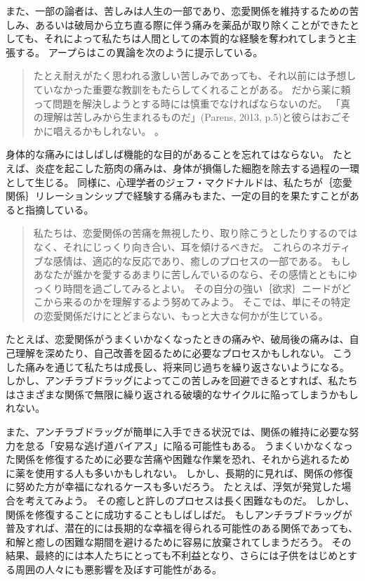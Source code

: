 \documentclass[paper=a4,book,openany]{jlreq}
\newcommand{\ig}[1]{}           %
\begin{document}
また、一部の論者は、苦しみは人生の一部であり、恋愛関係を維持するための苦しみ、あるいは破局から立ち直る際に伴う痛みを薬品が取り除くことができたとしても、それによって私たちは人間としての本質的な経験を奪われてしまうと主張する。
アープらはこの異論を次のように提示している。

\begin{quote}
たとえ耐えがたく思われる激しい苦しみであっても、それ以前には予想していなかった重要な教訓をもたらしてくれることがある。
だから薬に頼って問題を解決しようとする時には慎重でなければならないのだ。
「真の理解は苦しみから生まれるものだ」(Parens, 2013, p.5)\ig{Parens}と彼らはおごそかに唱えるかもしれない。
\citep[p.12]{earp13:_if_i_could_just_stop_lovin_you}\nocite{parens13:_good_bad_forms_medic}。
\end{quote}

身体的な痛みにはしばしば機能的な目的があることを忘れてはならない。
たとえば、炎症を起こした筋肉の痛みは、身体が損傷した細胞を除去する過程の一環として生じる。
同様に、心理学者のジェフ・マクドナルド\ig{(Geoff MacDonald)}は、私たちが｛恋愛関係｝{リレーションシップ}で経験する痛みもまた、一定の目的を果たすことがあると指摘している。

\begin{quote}
私たちは、恋愛関係の苦痛を無視したり、取り除こうとしたりするのではなく、それにじっくり向き合い、耳を傾けるべきだ。
これらのネガティブな感情は、適応的な反応であり、癒しのプロセスの一部である。
もしあなたが誰かを愛するあまりに苦しんでいるのなら、その感情とともにゆっくり時間を過ごしてみるとよい。
その自分の強い｛欲求｝{ニード}がどこから来るのかを理解するよう努めてみよう。
そこでは、単にその特定の恋愛関係だけにとどまらない、もっと大きな何かが生じている。
\citep{lawson17:_why_does_love_hurt_so_much}
\end{quote}

たとえば、恋愛関係がうまくいかなくなったときの痛みや、破局後の痛みは、自己理解を深めたり、自己改善を図るために必要なプロセスかもしれない。
こうした痛みを通じて私たちは成長し、将来同じ過ちを繰り返さないようになる。
しかし、アンチラブドラッグによってこの苦しみを回避できるとすれば、私たちはさまざまな関係で無限に繰り返される破壊的なサイクルに陥ってしまうかもしれない。

また、アンチラブドラッグが簡単に入手できる状況では、関係の維持に必要な努力を怠る「安易な逃げ道バイアス」に陥る可能性もある。
うまくいかなくなった関係を修復するために必要な苦痛や困難な作業を恐れ、それから逃れるために薬を使用する人も多いかもしれない。
しかし、長期的に見れば、関係の修復に努めた方が幸福になれるケースも多いだろう。
たとえば、浮気が発覚した場合を考えてみよう。
その癒しと許しのプロセスは長く困難なものだ。
しかし、関係を修復することに成功することもしばしばだ。
もしアンチラブドラッグが普及すれば、潜在的には長期的な幸福を得られる可能性のある関係であっても、和解と癒しの困難な期間を避けるために容易に放棄されてしまうだろう。
その結果、最終的には本人たちにとっても不利益となり、さらには子供をはじめとする周囲の人々にも悪影響を及ぼす可能性がある。
\end{document}
